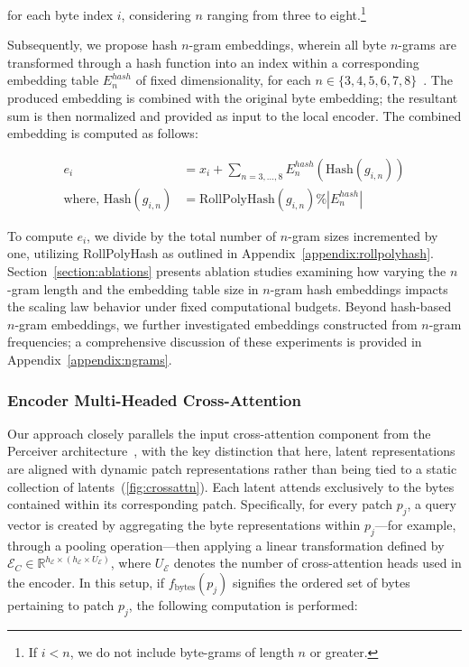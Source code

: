 for each byte index $i$, considering $n$ ranging from three to eight.\footnote{
If $i < n$, we do not include byte-grams of length $n$ or greater.
}

Subsequently, we propose hash $n$-gram embeddings, wherein all byte $n$-grams are transformed through a hash function into an index within a corresponding embedding table $E_{n}^{hash}$ of fixed dimensionality, for each $n \in \{3,4,5,6,7,8\}$~\citep{bai2010learning}. The produced embedding is combined with the original byte embedding; the resultant sum is then normalized and provided as input to the local encoder. The combined embedding is computed as follows:

\begin{align}
e_i &= x_i + \sum_{n = 3,...,8}E_{n}^{hash}(\text{Hash}(g_{i,n})) \\
\text{where, Hash}(g_{i,n}) &= \text{RollPolyHash}(g_{i,n}) \% |E_{n}^{hash}|
\end{align}

To compute $e_i$, we divide by the total number of $n$-gram sizes incremented by one, utilizing RollPolyHash as outlined in Appendix~\ref{appendix:rollpolyhash}. Section~\ref{section:ablations} presents ablation studies examining how varying the $n$-gram length and the embedding table size in $n$-gram hash embeddings impacts the scaling law behavior under fixed computational budgets. Beyond hash-based $n$-gram embeddings, we further investigated embeddings constructed from $n$-gram frequencies; a comprehensive discussion of these experiments is provided in Appendix~\ref{appendix:ngrams}.

\subsubsection{Encoder Multi-Headed Cross-Attention}
\label{sec:enc-cross-attn}
Our approach closely parallels the input cross-attention component from the Perceiver architecture~\citep{jaegle2021perceiver}, with the key distinction that here, latent representations are aligned with dynamic patch representations rather than being tied to a static collection of latents~(\autoref{fig:crossattn}). Each latent attends exclusively to the bytes contained within its corresponding patch. Specifically, for every patch $p_j$, a query vector is created by aggregating the byte representations within $p_j$—for example, through a pooling operation—then applying a linear transformation defined by $\mathcal{E}_{C} \in \mathbb{R}^{h_{\mathcal{E}} \times (h_{\mathcal{E}} \times U_{\mathcal{E}})}$, where $U_{\mathcal{E}}$ denotes the number of cross-attention heads used in the encoder. In this setup, if $f_{\text{bytes}}(p_j)$ signifies the ordered set of bytes pertaining to patch $p_j$, the following computation is performed:

